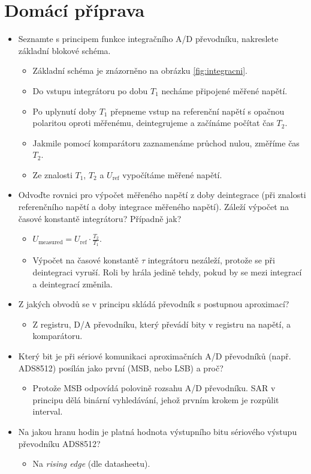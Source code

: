 \documentclass[a4paper,12pt]{article}
\begin{document}
\section{Domácí příprava}
\begin{itemize}
  \item Seznamte s principem funkce integračního A/D převodníku, nakreslete základní blokové schéma. 
    \begin{itemize}
      \item Základní schéma je znázorněno na obrázku \ref{fig:integracni}.
      \item Do vstupu integrátoru po dobu $T_1$ necháme připojené měřené napětí.
      \item Po uplynutí doby $T_1$ přepneme vstup na referenční napětí s opačnou polaritou oproti měřenému, deintegrujeme a začínáme počítat čas $T_2$.
      \item Jakmile pomocí komparátoru zaznamenáme průchod nulou, změříme čas $T_2$.
      \item Ze znalosti $T_1$, $T_2$ a $U_{\mathrm{ref}}$ vypočítáme měřené napětí.
    \end{itemize}
  \item Odvoďte rovnici pro výpočet měřeného napětí z doby deintegrace (při znalosti referenčního napětí a doby integrace měřeného napětí). Záleží výpočet na časové konstantě integrátoru? Případně jak?
    \begin{itemize}
      \item $U_{\mathrm{measured}} = U_{\mathrm{ref}} \cdot \frac{T_2}{T_1}$.
      \item Výpočet na časové konstantě $\tau$ integrátoru nezáleží, protože se při deintegraci vyruší. Roli by hrála jedině tehdy, pokud by se mezi integrací a deintegrací změnila.
    \end{itemize}
  \item Z jakých obvodů se v principu skládá převodník s postupnou aproximací?
    \begin{itemize}
      \item Z registru, D/A převodníku, který převádí bity v registru na napětí, a komparátoru.
    \end{itemize}
  \item Který bit je při sériové komunikaci aproximačních A/D převodníků (např. ADS8512) posílán jako první (MSB, nebo LSB) a proč?
    \begin{itemize}
      \item Protože MSB odpovídá polovině rozsahu A/D převodníku. SAR v principu dělá binární vyhledávání, jehož prvním krokem je rozpůlit interval.
    \end{itemize}
  \item Na jakou hranu hodin je platná hodnota výstupního bitu sériového výstupu převodníku ADS8512?
    \begin{itemize}
      \item Na \textit{rising edge} (dle datasheetu).
    \end{itemize}
\end{itemize}
\end{document}

